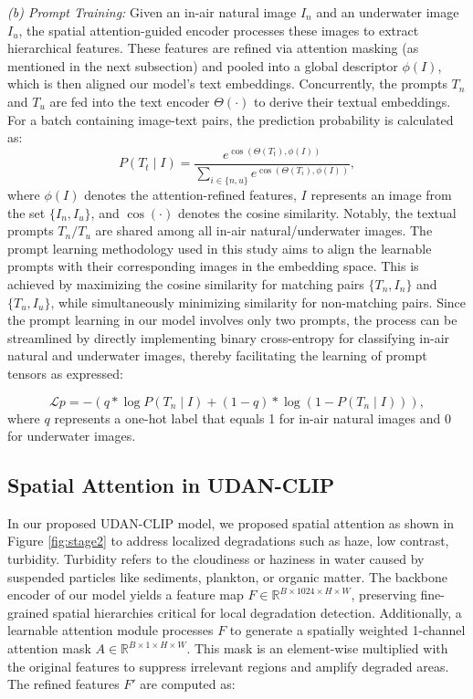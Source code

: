 \documentclass[3p,12pt,authoryear]{elsarticle}
\begin{document}
{\textit{(b) Prompt Training:}}
Given an in-air natural image \( I_n \) and an underwater image \( I_u \), the spatial attention-guided encoder processes these images to extract hierarchical features. These features are refined via attention masking (as mentioned in the next subsection) and pooled into a global descriptor \( \phi(I) \), which is then aligned our model's text embeddings. Concurrently, the prompts $T_n$ and $T_u$ are fed into the text encoder $\Theta(\cdot)$ to derive their textual embeddings. For a batch containing image-text pairs, the prediction probability is calculated as:
\begin{equation}
\label{12}
P(T_t \mid I) = \frac{e^{\cos(\Theta(T_t), \phi(I))}}{\sum_{i \in \{n, u\}} e^{\cos(\Theta(T_i), \phi(I))}},
\end{equation}
where \( \phi(I) \) denotes the attention-refined features, $I$ represents an image from the set $\{I_n, I_u\}$, and $\cos(\cdot)$ denotes the cosine similarity. Notably, the textual prompts $T_n/T_u$ are shared among all in-air natural/underwater images. The prompt learning methodology used in this study aims to align the learnable prompts with their corresponding images in the embedding space. This is achieved by maximizing the cosine similarity for matching pairs $\{T_n, I_n\}$ and $\{T_u, I_u\}$, while simultaneously minimizing similarity for non-matching pairs. Since the prompt learning in our model involves only two prompts, the process can be streamlined by directly implementing binary cross-entropy for classifying in-air natural and underwater images, thereby facilitating the learning of prompt tensors as expressed:

\begin{equation}
\label{13}
\mathcal{L}p = -(q \ast \log P(T_n \mid I) + (1 - q) \ast \log(1 - P(T_n \mid I))), 
\end{equation}
where $q$ represents a one-hot label that equals 1 for in-air natural images and 0 for underwater images.

\subsection{Spatial Attention in UDAN-CLIP}

In our proposed UDAN-CLIP model, we proposed  spatial attention as shown in Figure \ref{fig:stage2} to address localized degradations such as haze, low contrast, turbidity. Turbidity refers to the cloudiness or haziness in water caused by suspended particles like sediments, plankton, or organic matter. The backbone encoder of our model yields a feature map \( F \in \mathbb{R}^{B \times 1024 \times H \times W} \), preserving fine-grained spatial hierarchies critical for local degradation detection. Additionally, a learnable attention module processes \( F \) to generate a spatially weighted 1-channel attention mask \( A \in \mathbb{R}^{B \times 1 \times H \times W} \). This mask is an element-wise multiplied with the original features to suppress irrelevant regions and amplify degraded areas.
The refined features \( F' \) are computed as:
\end{document}
